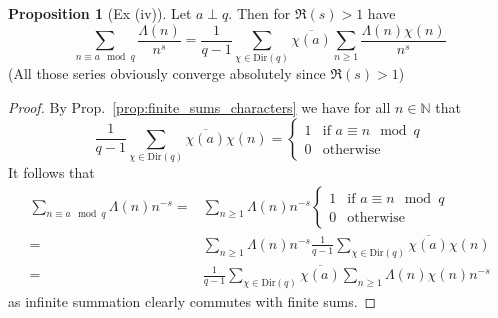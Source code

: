 \documentclass{scrartcl}
\newcommand{\N}{\mathbb{N}}
\theoremstyle{definition}
\newtheorem{proposition}[definition]{Proposition}
\begin{document}
\begin{proposition}[Ex (iv)]
    \label{prop:representation_mangoldt_series_congruent_a}
    Let $a \perp q$. Then for $\Re(s) > 1$ have
    \begin{equation*}
        \sum_{n \equiv a \mod q} \frac {\Lambda(n)} {n^s} = \frac 1 {q - 1} \sum_{\chi \in \mathrm{Dir}(q)} \overline{\chi(a)} \sum_{n \geq 1} \frac {\Lambda(n) \chi(n)} {n^s}
    \end{equation*}
    (All those series obviously converge absolutely since $\Re(s) > 1$)
\end{proposition}
\begin{proof}
    By Prop.~\ref{prop:finite_sums_characters} we have for all $n \in \N$ that
    \begin{equation*}
        \frac 1 {q - 1} \sum_{\chi \in \mathrm{Dir}(q)} \overline{\chi(a)} \chi(n) = \begin{cases}
            1 & \text{if $a \equiv n \mod q$} \\
            0 & \text{otherwise}
        \end{cases}
    \end{equation*}
    It follows that
    \begin{align*}
        \sum_{n \equiv a \mod q} \Lambda(n) n^{-s} =& \sum_{n \geq 1} \Lambda(n) n^{-s} \begin{cases}
            1 & \text{if $a \equiv n \mod q$} \\
            0 & \text{otherwise}
        \end{cases} \\
        =& \sum_{n \geq 1} \Lambda(n) n^{-s} \frac 1 {q - 1} \sum_{\chi \in \mathrm{Dir}(q)} \overline{\chi(a)} \chi(n) \\
        =& \frac 1 {q - 1} \sum_{\chi \in \mathrm{Dir}(q)} \overline{\chi(a)} \sum_{n \geq 1} \Lambda(n) \chi(n) n^{-s} 
    \end{align*}
    as infinite summation clearly commutes with finite sums.
\end{proof}
\end{document}
